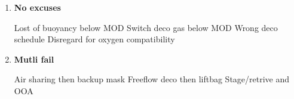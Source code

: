 \documentclass[english,11pt,a4paper]{article}
\begin{document}
\begin{enumerate}
	\item \textbf{No excuses}
	\begin{multicols}{2}
		\begin{outline}
				\1 Lost of buoyancy below MOD
				\1 Switch deco gas below MOD
				\1 Wrong deco schedule
				\vspace{1em}
				\1 Disregard for oxygen compatibility
		\end{outline}
	\end{multicols}
	
	\item \textbf{Mutli fail}
	\begin{multicols}{2}
		\begin{outline}
				\1 Air sharing then backup mask
				\1 Freeflow deco then liftbag
				\1 Stage/retrive and OOA
		\end{outline}
	\end{multicols}
\end{enumerate}
	
\end{document}
